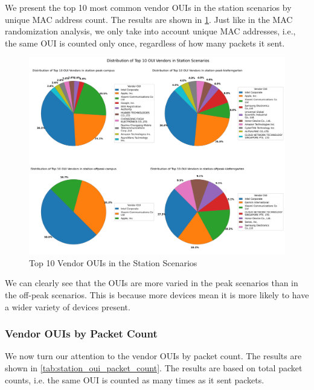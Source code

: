 \documentclass[sigconf,nonacm]{acmart}
\begin{document}
We present the top 10 most common vendor OUIs in the station scenarios by unique MAC address count. The results are shown in \cref{tab:station_oui}. Just like in the MAC randomization analysis, we only take into account unique MAC addresses, i.e., the same OUI is counted only once, regardless of how many packets it sent.

\begin{figure}
    \centering
    \includegraphics[width=\columnwidth]{images/part1/oui-vendors/station-scenarios.png}
    \caption{Top 10 Vendor OUIs in the Station Scenarios}
    \label{tab:station_oui}
\end{figure}

We can clearly see that the OUIs are more varied in the peak scenarios than in the off-peak scenarios. This is because more devices mean it is more likely to have a wider variety of devices present.

\subsubsection{Vendor OUIs by Packet Count}
\label{sec:part-1/station/oui-packet-count}

We now turn our attention to the vendor OUIs by packet count. The results are shown in \cref{tab:station_oui_packet_count}. The results are based on total packet counts, i.e. the same OUI is counted as many times as it sent packets.
\end{document}

